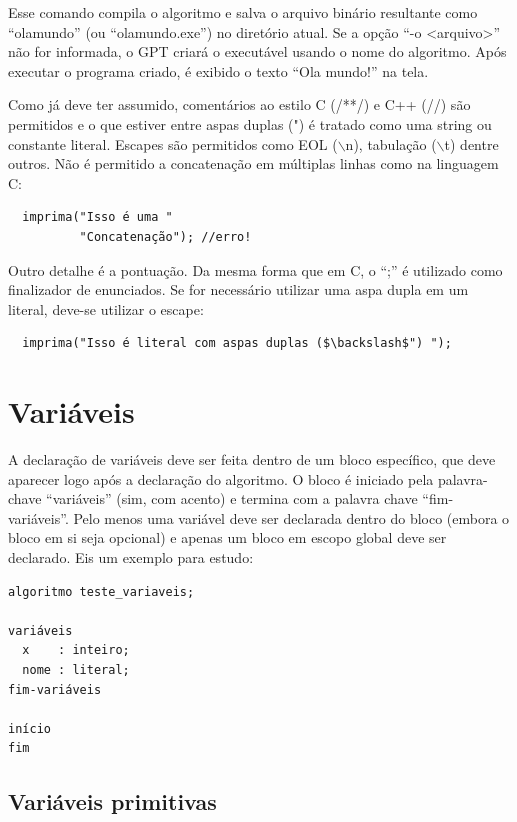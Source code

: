 \documentclass[a4paper,11pt]{report}
\begin{document}
Esse comando compila o algoritmo e salva o arquivo binário resultante como
``olamundo'' (ou ``olamundo.exe'') no diretório atual. Se a opção ``-o
<arquivo>'' não for informada, o GPT criará o executável usando o nome do
algoritmo. Após executar o programa criado, é exibido o texto ``Ola mundo!'' na
tela.
\bigskip

Como já deve ter assumido, comentários ao estilo C (/**/) e C++ (//) são
permitidos e o que estiver entre aspas duplas (") é tratado como uma string ou
constante literal. Escapes são permitidos como EOL ($\backslash$n), tabulação
($\backslash$t) dentre outros. Não é permitido a concatenação em múltiplas
linhas como na linguagem C:

\begin{verbatim}
  imprima("Isso é uma "
          "Concatenação"); //erro!
\end{verbatim}

Outro detalhe é a pontuação. Da mesma forma que em C, o ``;'' é utilizado como
finalizador de enunciados. Se for necessário utilizar uma aspa dupla em um
literal, deve-se utilizar o escape:

\begin{verbatim}
  imprima("Isso é literal com aspas duplas ($\backslash$") ");
\end{verbatim}

\section{Variáveis}

A declaração de variáveis deve ser feita dentro de um bloco específico, que deve
aparecer logo após a declaração do algoritmo. O bloco é iniciado pela
palavra-chave ``variáveis'' (sim, com acento) e termina com a palavra chave
``fim-variáveis''. Pelo menos uma variável deve ser declarada dentro do bloco
(embora o bloco em si seja opcional) e apenas um bloco em escopo global deve ser
declarado. Eis um exemplo para estudo:

\begin{program}
  \begin{verbatim}
algoritmo teste_variaveis;

variáveis
  x    : inteiro;
  nome : literal;
fim-variáveis

início
fim
  \end{verbatim}
  \caption{Declaração de variáveis globais.}
  \label{programa_inutil}
\end{program}

\subsection{Variáveis primitivas}
\end{document}
